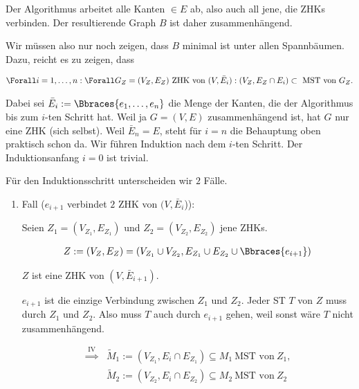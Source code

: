 \begin{solution}
\begin{enumerate}[label = (\Alph*)]
    Der Algorithmus arbeitet alle Kanten $\in E$ ab, also auch all jene, die ZHKs verbinden.
    Der resultierende Graph $B$ ist daher zusammenhängend.

    Wir müssen also nur noch zeigen, dass $B$ minimal ist unter allen Spannbäumen.
    Dazu, reicht es zu zeigen, dass

    \begin{align*}
        \Forall i = 1, \dots, n:
        \Forall G_Z = (V_Z, E_Z) ~\text{ZHK von}~ (V, \bar E_i):
        (V_Z, E_Z \cap E_i) \subset ~\text{MST von}~ G_Z.
    \end{align*}

    Dabei sei $\bar E_i := \Bbraces{e_1, \dots, e_n}$ die Menge der Kanten, die der Algorithmus bis zum $i$-ten Schritt  hat.
    Weil ja $G = (V, E)$ zusammenhängend ist, hat $G$ nur eine ZHK (sich selbst).
    Weil $\bar E_n = E$, steht für $i = n$ die Behauptung oben praktisch schon da.
    Wir führen Induktion nach dem $i$-ten Schritt.
    Der Induktionsanfang $i = 0$ ist trivial.

    Für den Induktionsschritt unterscheiden wir $2$ Fälle.

    \begin{enumerate}[label = \arabic*.]

        \item Fall ($e_{i+1}$ verbindet $2$ ZHK von $(V, \bar E_i$)):
        
        Seien $Z_1 = (V_{Z_1}, E_{Z_1})$ und $Z_2 = (V_{Z_2}, E_{Z_2})$ jene ZHKs.

        \begin{align*}
            Z := (V_Z, E_Z) = (V_{Z_1} \cup V_{Z_2}, E_{Z_1} \cup E_{Z_2} \cup \Bbraces{e_{i+1}})
        \end{align*}

        $Z$ ist eine ZHK von $(V, \bar E_{i+1})$.

        $e_{i+1}$ ist die einzige Verbindung zwischen $Z_1$ und $Z_2$.
        Jeder ST $T$ von $Z$ muss durch $Z_1$ und $Z_2$.
        Also muss $T$ auch durch $e_{i+1}$ gehen, weil sonst wäre $T$ nicht zusammenhängend.

        \begin{align*}
            \stackrel
            {
                \mathrm{IV}
            }{\implies}
            & \tilde M_1 := (V_{Z_1}, E_i \cap E_{Z_1}) \subseteq M_1 ~\text{MST von}~ Z_1, \\
            & \tilde M_2 := (V_{Z_2}, E_i \cap E_{Z_2}) \subseteq M_2 ~\text{MST von}~ Z_2
        \end{align*}


\end{enumerate}
\end{enumerate}
\end{solution}
